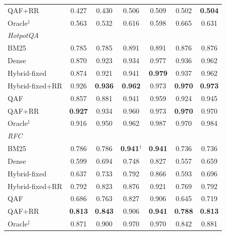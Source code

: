 \begin{table}[t]
{\begin{tabular}{lcccccc}
QAF+RR & 0.427 & 0.430 & 0.506 & 0.509 & 0.502 & \textbf{0.504} \\
Oracle$^{\ddagger}$ & 0.563 & 0.532 & 0.616 & 0.598 & 0.665 & 0.631 \\
\midrule
\multicolumn{7}{l}{\textit{HotpotQA}} \\
BM25 & 0.785 & 0.785 & 0.891 & 0.891 & 0.876 & 0.876 \\
Dense & 0.870 & 0.923 & 0.934 & 0.977 & 0.936 & 0.962 \\
Hybrid-fixed & 0.874 & 0.921 & 0.941 & \textbf{0.979} & 0.937 & 0.962 \\
Hybrid-fixed+RR & 0.926 & \textbf{0.936} & \textbf{0.962} & 0.973 & \textbf{0.970} & \textbf{0.973} \\
QAF & 0.857 & 0.881 & 0.941 & 0.959 & 0.924 & 0.945 \\
QAF+RR & \textbf{0.927} & 0.934 & 0.960 & 0.973 & \textbf{0.970} & 0.970 \\
Oracle$^{\ddagger}$ & 0.916 & 0.950 & 0.962 & 0.987 & 0.970 & 0.984 \\
\midrule
\multicolumn{7}{l}{\textit{RFC}} \\
BM25 & 0.786 & 0.786 & \textbf{0.941}$^{\dagger}$ & \textbf{0.941} & 0.736 & 0.736 \\
Dense & 0.599 & 0.694 & 0.748 & 0.827 & 0.557 & 0.659 \\
Hybrid-fixed & 0.637 & 0.733 & 0.792 & 0.866 & 0.593 & 0.696 \\
Hybrid-fixed+RR & 0.792 & 0.823 & 0.876 & 0.921 & 0.769 & 0.792 \\
QAF & 0.686 & 0.763 & 0.827 & 0.906 & 0.645 & 0.719 \\
QAF+RR & \textbf{0.813} & \textbf{0.843} & 0.906 & \textbf{0.941} & \textbf{0.788} & \textbf{0.813} \\
Oracle$^{\ddagger}$ & 0.871 & 0.900 & 0.970 & 0.970 & 0.842 & 0.881 \\
\bottomrule
\end{tabular}}
\end{table}
